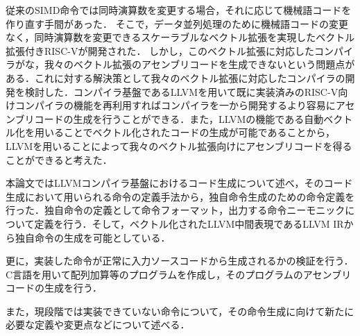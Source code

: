 従来のSIMD命令では同時演算数を変更する場合，それに応じて機械語コードを作り直す手間があった．
そこで，データ並列処理のために機械語コードの変更なく，同時演算数を変更できるスケーラブルなベクトル拡張を実現したベクトル拡張付きRISC-Vが開発された．
しかし，このベクトル拡張に対応したコンパイラがな，我々のベクトル拡張のアセンブリコードを生成できないという問題点がある．これに対する解決策として我々のベクトル拡張に対応したコンパイラの開発を検討した．コンパイラ基盤であるLLVMを用いて既に実装済みのRISC-V向けコンパイラの機能を再利用すればコンパイラを一から開発するより容易にアセンブリコードの生成を行うことができる．また，LLVMの機能である自動ベクトル化を用いることでベクトル化されたコードの生成が可能であることから，LLVMを用いることによって我々のベクトル拡張向けにアセンブリコードを得ることができると考えた．

本論文ではLLVMコンパイラ基盤におけるコード生成について述べ，そのコード生成において用いられる命令の定義手法から，独自命令生成のための命令定義を行った．独自命令の定義として命令フォーマット，出力する命令ニーモニックについて定義を行う．そして，ベクトル化されたLLVM中間表現であるLLVM IRから独自命令の生成を可能としている．

更に，実装した命令が正常に入力ソースコードから生成されるかの検証を行う．C言語を用いて配列加算等のプログラムを作成し，そのプログラムのアセンブリコードの生成を行う．

また，現段階では実装できていない命令について，その命令生成に向けて新たに必要な定義や変更点などについて述べる．